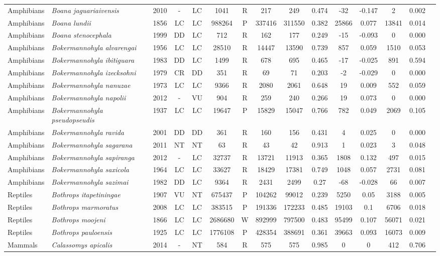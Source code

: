 \documentclass[12pt,openright,oneside,a4paper,english]{abntex2}
\begin{document}
\begin{landscape}
\begin{longtable}{llccccccccccccc}
		Amphibians&\textit{Boana jaguariaivensis}&2010&-&LC&1041&R&217&249&0.474&-32&-0.147&2&0.002\\
		Amphibians&\textit{Boana lundii}&1856&LC&LC&988264&P&337416&311550&0.382&25866&0.077&13841&0.014\\
		Amphibians&\textit{Boana stenocephala}&1999&DD&LC&712&R&162&177&0.249&-15&-0.093&0&0.000\\
		Amphibians&\textit{Bokermannohyla alvarengai}&1956&LC&LC&28510&R&14447&13590&0.739&857&0.059&1510&0.053\\
		Amphibians&\textit{Bokermannohyla ibitiguara}&1983&DD&LC&1499&R&678&695&0.465&-17&-0.025&891&0.594\\
		Amphibians&\textit{Bokermannohyla izecksohni}&1979&CR&DD&351&R&69&71&0.203&-2&-0.029&0&0.000\\
		Amphibians&\textit{Bokermannohyla nanuzae}&1973&LC&LC&9366&R&2080&2061&0.648&19&0.009&552&0.059\\
		Amphibians&\textit{Bokermannohyla napolii}&2012&-&VU&904&R&259&240&0.266&19&0.073&0&0.000\\
		Amphibians&\textit{Bokermannohyla pseudopseudis}&1937&LC&LC&19647&P&15829&15047&0.766&782&0.049&2069&0.105\\
		Amphibians&\textit{Bokermannohyla ravida}&2001&DD&DD&361&R&160&156&0.431&4&0.025&0&0.000\\
		Amphibians&\textit{Bokermannohyla sagarana}&2011&NT&NT&63&R&43&42&0.913&1&0.023&3&0.048\\
		Amphibians&\textit{Bokermannohyla sapiranga}&2012&-&LC&32737&R&13721&11913&0.365&1808&0.132&497&0.015\\
		Amphibians&\textit{Bokermannohyla saxicola}&1964&LC&LC&33627&R&18429&17381&0.749&1048&0.057&2731&0.081\\
		Amphibians&\textit{Bokermannohyla sazimai}&1982&DD&LC&9364&R&2431&2499&0.27&-68&-0.028&66&0.007\\
		Reptiles&\textit{Bothrops itapetiningae}&1907&VU&NT&675437&P&104262&99012&0.239&5250&0.05&3188&0.005\\
		Reptiles&\textit{Bothrops marmoratus}&2008&LC&LC&383515&P&191336&172233&0.485&19103&0.1&6706&0.018\\
		Reptiles&\textit{Bothrops moojeni}&1866&LC&LC&2686680&W&892999&797500&0.483&95499&0.107&56071&0.021\\
		Reptiles&\textit{Bothrops pauloensis}&1925&LC&LC&1776108&P&428354&388691&0.361&39663&0.093&16073&0.009\\
		Mammals&\textit{Calassomys apicalis}&2014&-&NT&584&R&575&575&0.985&0&0&412&0.706\\

\end{longtable}
\end{landscape}
\end{document}
